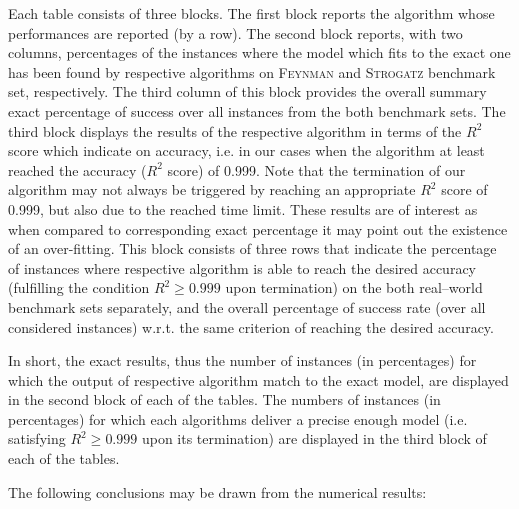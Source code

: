 \documentclass[a4paper,12pt]{elsarticle}
\begin{document}
Each table consists of three blocks. The first block reports the algorithm whose performances are reported (by a row). The second block reports, with two columns,  percentages of the instances where the model which fits to the exact one has been found by respective algorithms on \textsc{Feynman} and \textsc{Strogatz} benchmark set, respectively. The third column of this block provides the overall summary exact percentage of success over all instances from the both benchmark sets. The third block displays the results of the respective algorithm in terms of the $R^2$ score which indicate on  accuracy, i.e. in our cases when the algorithm  at least reached the accuracy ($R^2$ score) of 0.999.  Note that the termination of our algorithm may not always be triggered by reaching an appropriate $R^2$ score of 0.999, but also due to the reached time limit. These results are of interest as when compared to corresponding exact percentage it may point out the existence of an over-fitting. This block consists of three rows that indicate the percentage of instances where respective algorithm is able to reach the desired accuracy (fulfilling the condition $R^2 \geq 0.999$ upon termination) on the both real--world benchmark sets separately, and the overall percentage of success rate (over all considered instances) w.r.t. the same criterion of reaching the desired accuracy.


In short, the exact results, thus the number of instances (in percentages) for which the output of respective algorithm match to the exact model, are displayed in the second block of each of the tables. The numbers of instances (in percentages) for which each algorithms deliver a precise enough model (i.e. satisfying $R^2\geq 0.999$ upon its termination) are displayed in the third block of each of the tables. 

The following conclusions may be drawn from the numerical results: 
\end{document}
